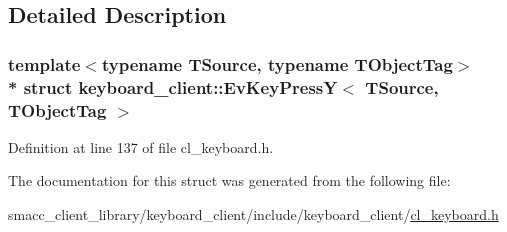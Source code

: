\subsection{Detailed Description}
\subsubsection*{template$<$typename T\+Source, typename T\+Object\+Tag$>$\\*
struct keyboard\+\_\+client\+::\+Ev\+Key\+Press\+Y$<$ T\+Source, T\+Object\+Tag $>$}



Definition at line 137 of file cl\+\_\+keyboard.\+h.



The documentation for this struct was generated from the following file\+:\begin{DoxyCompactItemize}
\item 
smacc\+\_\+client\+\_\+library/keyboard\+\_\+client/include/keyboard\+\_\+client/\hyperlink{cl__keyboard_8h}{cl\+\_\+keyboard.\+h}\end{DoxyCompactItemize}
